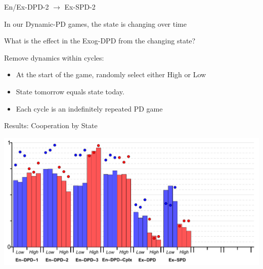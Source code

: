\documentclass{beamer}
\begin{document}
\begin{frame}{En/Ex-DPD-2 $\rightarrow$ Ex-SPD-2}

\begin{card}
In our Dynamic-PD games, the state is changing over time

What is the effect in the Exog-DPD from the changing state?
\end{card}
\begin{card}[Manipulation 5] Remove dynamics within cycles:

    \begin{itemize}
    \item At the start of the game, randomly select either High or Low
    \item State tomorrow equals state today.
    \item Each cycle is an indefinitely repeated PD game
    \end{itemize}
\end{card}
\end{frame}

\begin{frame}{Results: Cooperation by State}
    \begin{card}
    \begin{center}
    	\includegraphics[width=1.0\textwidth]{./i/col_bar_StateCoop_block_ExIRPD.pdf}
    \end{center}
    \end{card}
\end{frame}
\end{document}
